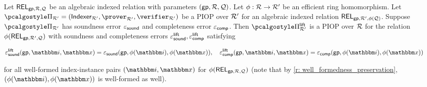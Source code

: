 \documentclass[11pt,letterpaper,usenames,dvipsnames]{article}
\newcommand{\albert}[1]{\textcolor{teal}{Albert: {#1}}}
\begin{document}
  

    
        \begin{lemma}\label{l: lift_preserves_soundness}
        Let $\mathsf{REL}_{\mathsf{gp},\mathcal{R},\mathcal{Q}}$ be an algebraic indexed relation with parameters $(\mathsf{gp},\mathcal{R},\mathcal{Q})$. Let $\phi:\mathcal{R} \to \mathcal{R}'$ be an efficient ring homomorphism. Let $\prot_{\R'}=(\indexer_{\R'}, \prover_{\R'}, \verifier_{\R'})$ be a  PIOP over $\mathcal{R}'$ for an algebraic indexed relation $\mathsf{REL}_{\mathsf{gp},\mathcal{R}',\phi(\mathcal{Q})}$. Suppose $\prot_{\R'}$ has soundness error $\varepsilon_{\mathsf{sound}}$ and completeness error $\varepsilon_{\mathsf{comp}}$. Then  $\prot_{\R'}^\lift$ is a PIOP over $\mathcal{R}$ for the relation $\phi(\mathsf{REL}_{\mathsf{gp},\mathcal{R}', \mathcal{Q}})$ with soundness and completeness errors $\varepsilon_{\mathsf{sound}}^{\mathsf{lift}}, \varepsilon_{\mathsf{comp}}^{\mathsf{lift}}$ satisfying
        
            $$\eps_{\soundness}^\lift(\gparams, \idx,\inp) = \eps_{\soundness}(\gparams, \phi(\idx), \phi(\inp)), \quad \eps_{\completeness}^\lift(\gparams, \idx,\inp) = \eps_{\completeness}(\gparams, \phi(\idx), \phi(\inp))$$
        
        for all well-formed index-instance pairs $(\idx,\inp)$ for $\phi(\mathsf{REL}_{\mathsf{gp},\mathcal{R}, \mathcal{Q}})$ (note that by \cref{r: well_formedness_preservation}, $(\phi(\idx),\phi(\inp))$ is well-formed as well).
        \end{lemma}
\end{document}
